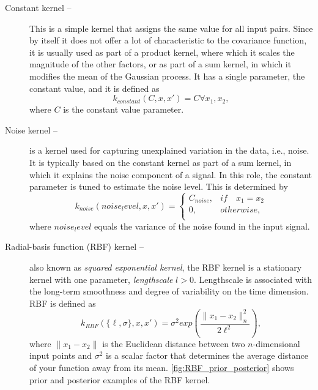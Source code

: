 \begin{description}
	
	\item[Constant kernel -- ]
	This is a simple kernel that assigns the same value for all input pairs.
	Since by itself it does not offer a lot of characteristic to the covariance function, it is usually used as part of a product kernel, where which it scales the magnitude of the other factors, or as part of a sum kernel, in which it modifies the mean of the Gaussian process.
	It has a single parameter, the constant value, and it is defined as 
	\begin{equation}
		\label{eq:constant_kernel}
		k_{constant}(C, x, x') = C\forall x_1, x_2,
	\end{equation}
	where $C$ is the constant value parameter.
	
	\item[Noise kernel -- ]
	is a kernel used for capturing unexplained variation in the data, i.e., noise.
	It is typically based on the constant kernel as part of a sum kernel, in which it explains the noise component of a signal.
	In this role, the constant parameter is tuned to estimate the noise level.
	This is determined by
	\begin{equation}
		\label{eq:noise_kernel}
		k_{noise}({noise_level}, x, x') =
		\begin{cases}
		C_{noise}, & if\quad x_1 = x_2\\
		0, & otherwise,\\
		\end{cases}
	\end{equation}
	where $noise_level$ equals the variance of the noise found in the input signal.
	
	\item[Radial-basis function (RBF) kernel --]
	also known as \emph{squared exponential kernel}, the RBF kernel is a stationary kernel with one parameter, \emph{lengthscale} $l > 0$.
	Lengthscale is associated with the long-term smoothness and degree of variability on the time dimension.
	RBF is defined as
	\begin{equation}
		\label{eq:RBF_kernel}
		k_{RBF}(\{\ell, \sigma\}, x, x') = \sigma^2 exp\left(\frac{\lVert x_1 - x_2 \lVert ^2_n}{2\ell^2}\right),
	\end{equation}
	where $\lVert x_1 - x_2 \lVert$ is the Euclidean distance between two $n$-dimensional input points and $\sigma^2$ is a scalar factor that determines the average distance of your function away from its mean.
	\cref{fig:RBF_prior_posterior} shows prior and posterior examples of the RBF kernel.
	

\end{description}
